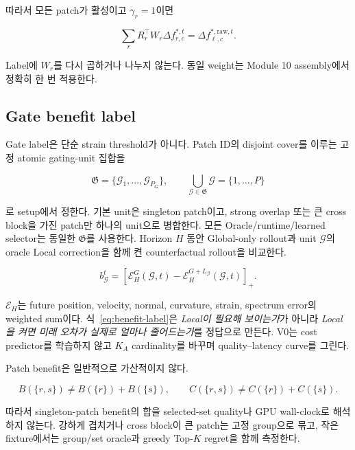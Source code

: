 \documentclass[11pt,a4paper]{article}
\begin{document}
따라서 모든 patch가 활성이고 \(\gamma_r=1\)이면

\begin{equation}
  \sum_rR_r^\top W_r\Delta f_{r,c}^{*,t}
  =
  \Delta f_{\ell,c}^{*,\mathrm{raw},t}.
\end{equation}

Label에 \(W_r\)를 다시 곱하거나 나누지 않는다.
동일 weight는 Module 10 assembly에서 정확히 한 번 적용한다.

\subsection{Gate benefit label}

Gate label은 단순 strain threshold가 아니다.
Patch ID의 disjoint cover를 이루는 고정 atomic gating-unit 집합을

\begin{equation}
  \mathfrak G=\{\mathcal G_1,\ldots,\mathcal G_{P_G}\},
  \qquad
  \bigcup_{\mathcal G\in\mathfrak G}\mathcal G=\{1,\ldots,P\}
\end{equation}

로 setup에서 정한다. 기본 unit은 singleton patch이고,
strong overlap 또는 큰 cross block을 가진 patch만 하나의 unit으로 병합한다.
모든 Oracle/runtime/learned selector는 동일한 \(\mathfrak G\)를 사용한다.
Horizon \(H\) 동안 Global-only rollout과 unit \(\mathcal G\)의
oracle Local correction을 함께 켠 counterfactual rollout을 비교한다.

\begin{equation}
  b_{\mathcal G}^t
  =
  [\mathcal E_H^{G}(\mathcal G,t)
  -\mathcal E_H^{G+L_{\mathcal G}}(\mathcal G,t)]_+.
  \label{eq:benefit-label}
\end{equation}

\(\mathcal E_H\)는 future position, velocity, normal, curvature,
strain, spectrum error의 weighted sum이다.
식~\eqref{eq:benefit-label}은 \emph{Local이 필요해 보이는가}가 아니라
\emph{Local을 켜면 미래 오차가 실제로 얼마나 줄어드는가}를 정답으로 만든다.
V0는 cost predictor를 학습하지 않고 \(K_A\) cardinality를 바꾸며 quality--latency curve를 그린다.

Patch benefit은 일반적으로 가산적이지 않다.

\begin{equation}
  B(\{r,s\})\ne B(\{r\})+B(\{s\}),
  \qquad
  C(\{r,s\})\ne C(\{r\})+C(\{s\}).
\end{equation}

따라서 singleton-patch benefit의 합을 selected-set quality나 GPU wall-clock로 해석하지 않는다.
강하게 겹치거나 cross block이 큰 patch는 고정 group으로 묶고,
작은 fixture에서는 group/set oracle과 greedy Top-\(K\) regret을 함께 측정한다.
\end{document}
